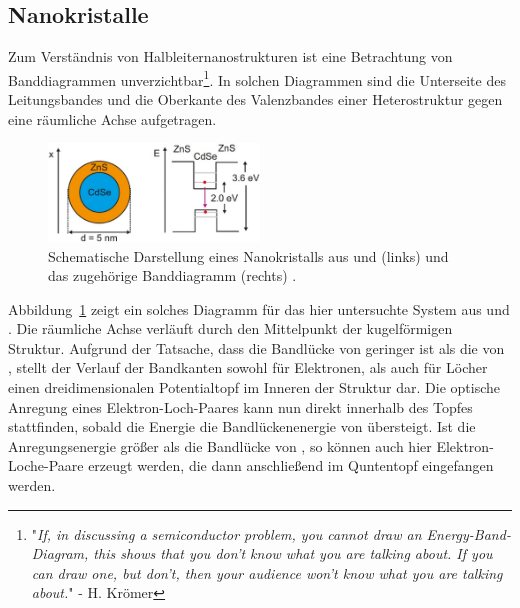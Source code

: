 \subsection{Nanokristalle}
Zum Verständnis von Halbleiternanostrukturen ist eine Betrachtung von Banddiagrammen unverzichtbar\footnote{"\textit{If,
in discussing a semiconductor problem, you cannot draw an Energy-Band-Diagram, this shows
that you don't know what you are talking about. If you can draw one, but don't, then your audience
won't know what you are talking about.}"  - H. Krömer}. In solchen Diagrammen sind
die Unterseite des Leitungsbandes und die Oberkante des Valenzbandes einer Heterostruktur gegen eine
räumliche Achse aufgetragen.
\begin{figure}
  \centering
  \includegraphics[width = 0.5\textwidth]{pics/banddiagramm.png}
  \caption{Schematische Darstellung eines Nanokristalls aus  und  (links) und
  das zugehörige Banddiagramm (rechts) \cite{anleitung_pl}.}
  \label{fig: energy_diagram}
\end{figure}
Abbildung~\ref{fig: energy_diagram} zeigt ein solches Diagramm für das hier untersuchte System aus  und
. Die räumliche Achse verläuft durch den Mittelpunkt der kugelförmigen Struktur. Aufgrund der Tatsache, dass
die Bandlücke von  geringer ist als die von , stellt der Verlauf der Bandkanten sowohl für Elektronen, als auch
für Löcher einen dreidimensionalen Potentialtopf im Inneren der Struktur dar. Die optische Anregung eines Elektron-Loch-Paares
kann nun direkt innerhalb des Topfes stattfinden, sobald die Energie die Bandlückenenergie von  übersteigt. Ist die
Anregungsenergie größer als die Bandlücke von , so können auch hier Elektron-Loche-Paare erzeugt werden, die dann
anschließend im Quntentopf eingefangen werden.


